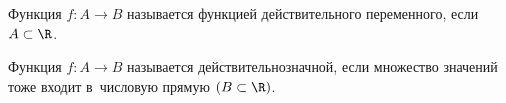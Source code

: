 
Функция $f\colon A\to B$ называется функцией действительного переменного, если $A\subset \R$.

Функция $f\colon A\to B$ называется действительнозначной, если множество значений тоже входит в~числовую прямую $(B\subset \R)$.
